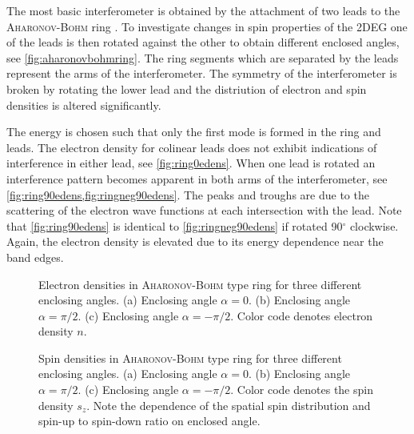 The most basic interferometer is obtained by the attachment of two leads to the \textsc{Aharonov-Bohm} ring \cite{PhysRevLett.79.273}. To investigate changes in spin properties of the 2DEG one of the leads is then rotated against the other to obtain different enclosed angles, see \cref{fig:aharonovbohmring}. The ring segments which are separated by the leads represent the arms of the interferometer. The symmetry of the interferometer is broken by rotating the lower lead and the distriution of electron and spin densities is altered significantly.\par
The energy is chosen such that only the first mode is formed in the ring and leads. The electron density for colinear leads does not exhibit indications of interference in either lead, see \cref{fig:ring0edens}. When one lead is rotated an interference pattern becomes apparent in both arms of the interferometer, see \cref{fig:ring90edens,fig:ringneg90edens}. The peaks and troughs are due to the scattering of the electron wave functions at each intersection with the lead. Note that \cref{fig:ring90edens} is identical to \cref{fig:ringneg90edens} if rotated 90$^{\circ}$ clockwise. Again, the electron density is elevated due to its energy dependence near the band edges.\par
\begin{figure}[h!]
  \caption{Electron densities in \textsc{Aharonov-Bohm} type ring for three different enclosing angles. (a) Enclosing angle $\alpha=0$. (b) Enclosing angle $\alpha=\pi/2$. (c) Enclosing angle $\alpha=-\pi/2$. Color code denotes electron density $n$.} 
\end{figure}
\begin{figure}[h!]
  \caption{Spin densities in \textsc{Aharonov-Bohm} type ring for three different enclosing angles. (a) Enclosing angle $\alpha=0$. (b) Enclosing angle $\alpha=\pi/2$. (c) Enclosing angle $\alpha=-\pi/2$. Color code denotes the spin density $s_z$. Note the dependence of the spatial spin distribution and spin-up to spin-down ratio on enclosed angle.}
\end{figure}
